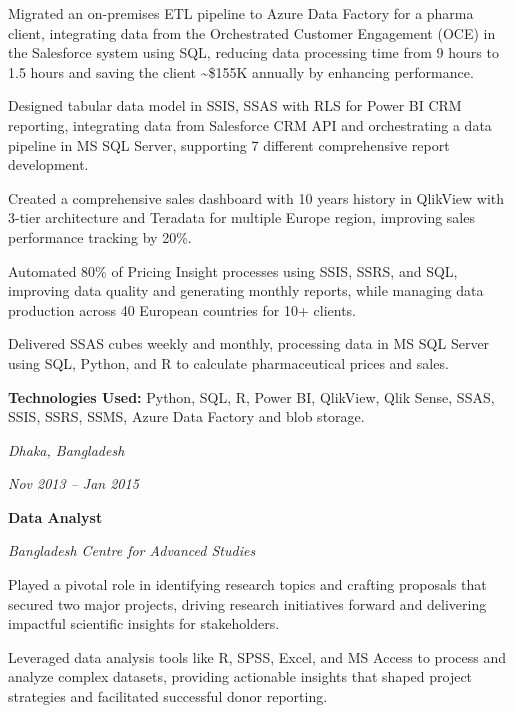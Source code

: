     \vspace{0.10 cm}
    \begin{onecolentry}
        \begin{highlights}   
            \item Migrated an on-premises ETL pipeline to Azure Data Factory for a pharma client, integrating data from the Orchestrated Customer Engagement (OCE) in the Salesforce system using SQL, reducing data processing time from 9 hours to 1.5 hours and saving the client \textasciitilde\$155K annually by enhancing performance.
            \item Designed tabular data model in SSIS, SSAS with RLS for Power BI CRM reporting, integrating data from Salesforce CRM API and orchestrating a data pipeline in MS SQL Server, supporting 7 different comprehensive report development.
            \item Created a comprehensive sales dashboard with 10 years history in QlikView with 3-tier architecture and Teradata for multiple Europe region, improving sales performance tracking by 20\%.
            \item Automated 80\% of Pricing Insight processes using SSIS, SSRS, and SQL, improving data quality and generating monthly reports, while managing data production across 40 European countries for 10+ clients.
            \item Delivered SSAS cubes weekly and monthly, processing data in MS SQL Server using SQL, Python, and R to calculate pharmaceutical prices and sales.
            
            \textbf{Technologies Used:} Python, SQL, R, Power BI, QlikView, Qlik Sense, SSAS, SSIS, SSRS, SSMS, Azure Data Factory and blob storage.
        \end{highlights}
    \end{onecolentry}


    \vspace{0.2 cm}       


    \begin{twocolentry}{
        \textit{Dhaka, Bangladesh}    
    
        \textit{Nov 2013 – Jan 2015}}
        \textbf{Data Analyst}
        
        \textit{Bangladesh Centre for Advanced Studies}
    \end{twocolentry}
    
    \vspace{0.10 cm}
    \begin{onecolentry}
        \begin{highlights}
            \item Played a pivotal role in identifying research topics and crafting proposals that secured two major projects, driving research initiatives forward and delivering impactful scientific insights for stakeholders.
            \item Leveraged data analysis tools like R, SPSS, Excel, and MS Access to process and analyze complex datasets, providing actionable insights that shaped project strategies and facilitated successful donor reporting.
        \end{highlights}
    \end{onecolentry}

